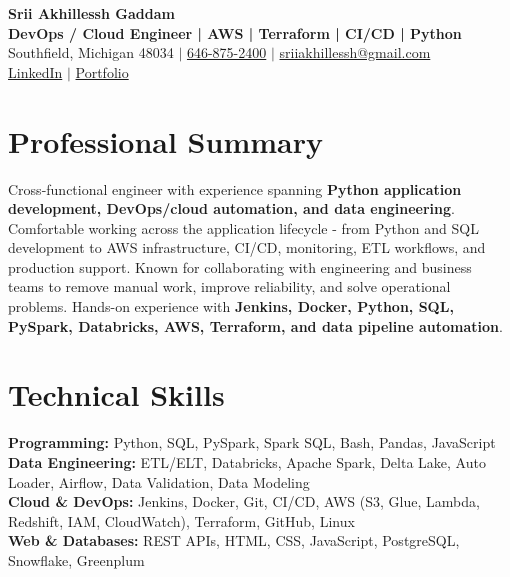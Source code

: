 \documentclass[letterpaper,10pt]{article}
\begin{document}
\fontsize{9.35pt}{10.45pt}\selectfont

\begin{center}
    {\LARGE \textbf{Srii Akhillessh Gaddam}} \\[-1pt]
    \textbf{DevOps / Cloud Engineer | AWS | Terraform | CI/CD | Python} \\[2pt]
    Southfield, Michigan 48034 $|$
    \href{tel:6468752400}{646-875-2400} $|$
    \href{mailto:sriiakhillessh@gmail.com}{sriiakhillessh@gmail.com} \\[1pt]
    \href{https://www.linkedin.com/in/srii-akhiilessh-gaddam-b48668191/}{LinkedIn} $|$
    \href{https://sriiakhillesshg.github.io/portfolio/}{Portfolio}
\end{center}
\vspace{-8pt}

\section{Professional Summary}
\small{Cross-functional engineer with experience spanning \textbf{Python application development, DevOps/cloud automation, and data engineering}. Comfortable working across the application lifecycle - from Python and SQL development to AWS infrastructure, CI/CD, monitoring, ETL workflows, and production support. Known for collaborating with engineering and business teams to remove manual work, improve reliability, and solve operational problems. Hands-on experience with \textbf{Jenkins, Docker, Python, SQL, PySpark, Databricks, AWS, Terraform, and data pipeline automation}.}

\section{Technical Skills}
\small{
\textbf{Programming:} Python, SQL, PySpark, Spark SQL, Bash, Pandas, JavaScript \\
\textbf{Data Engineering:} ETL/ELT, Databricks, Apache Spark, Delta Lake, Auto Loader, Airflow, Data Validation, Data Modeling \\
\textbf{Cloud \& DevOps:} Jenkins, Docker, Git, CI/CD, AWS (S3, Glue, Lambda, Redshift, IAM, CloudWatch), Terraform, GitHub, Linux \\
\textbf{Web \& Databases:} REST APIs, HTML, CSS, JavaScript, PostgreSQL, Snowflake, Greenplum
}
\end{document}
